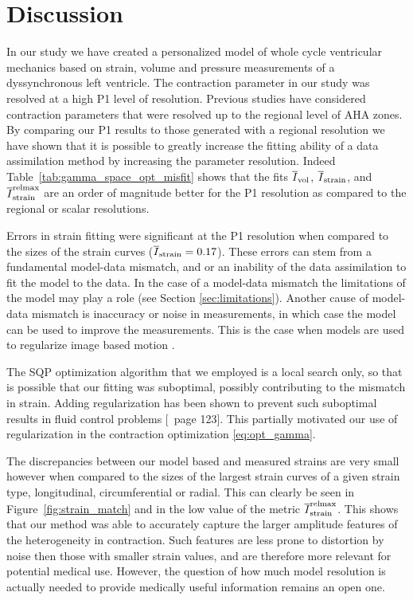 \section{Discussion}
\label{sec:discussion}
In our study we have created a personalized model of whole cycle ventricular mechanics
based on strain, volume and pressure measurements of a dyssynchronous left ventricle. 
The contraction parameter in our study was resolved at a high P1 level of resolution.
Previous studies \cite{wong2015velocity, chabiniok2012estimation} have considered
contraction parameters that were resolved up to the regional level of AHA zones. By comparing
our P1 results to those generated with a regional resolution we have shown that it is possible
to greatly increase the fitting ability of a data assimilation method by increasing the 
parameter resolution. Indeed Table~\ref{tab:gamma_space_opt_misfit} shows 
that the fits $\overline{I}_{\text{vol}}$, $\overline{I}_{\text{strain}}$, and  $\overline{I}^{\text{relmax}}_{\text{strain}}$ are an order of magnitude better for
the P1 resolution as compared to the regional or scalar resolutions. 

Errors in strain fitting were significant at the P1 resolution when compared 
to the sizes of the strain curves ($\overline{I}_{\text{strain}} = 0.17$). These errors can 
stem from a fundamental model-data 
mismatch, and or an inability of the data assimilation to fit the model to the data. 
In the case of a model-data mismatch the limitations of the model may play a role (see Section \ref{sec:limitations}).
Another cause of model-data mismatch
is inaccuracy or noise in measurements, in which case the model can be used to improve 
the measurements. This is the case when models are used to regularize image based motion
\cite{papademetris2002estimation, tuyisenge2016estimation}. 

The SQP optimization algorithm that we employed is a local search only, so that is possible that
our fitting was suboptimal, possibly contributing to the mismatch in strain. Adding regularization
has been shown to prevent such suboptimal results in fluid control problems [\cite{gunzburger2003perspectives}~page 123].
This partially motivated our use of regularization in the contraction optimization \eqref{eq:opt_gamma}.

The discrepancies between our model based and measured strains are very small however when compared to
the sizes of the largest strain curves of a given strain type, longitudinal, 
circumferential or radial. This can clearly be seen in Figure~\ref{fig:strain_match}
and in the low value of the metric $\overline{I}^{\text{relmax}}_{\text{strain}}$. This shows that our method was able
to accurately capture the larger amplitude features of the heterogeneity in contraction. 
Such features are less prone to distortion by noise then those with smaller strain values, and are
therefore more relevant for potential medical use. However, the question of how much 
model resolution is actually needed to provide medically useful information 
remains an open one.

